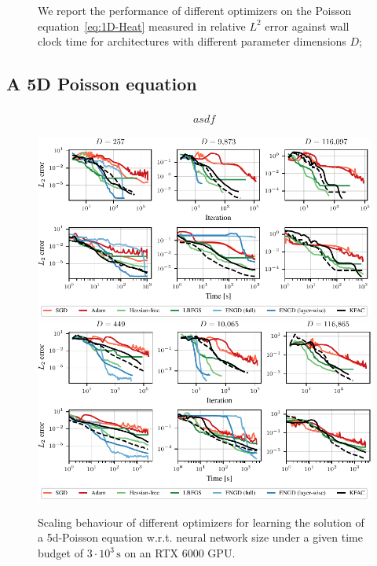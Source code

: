 \begin{figure}
    \centering
    \caption{We report the performance of different optimizers on the Poisson equation~\eqref{eq:1D-Heat} measured in relative $L^2$ error against wall clock time for architectures with different parameter dimensions $D$; }
    \label{fig:1D-heat}
\end{figure}


\subsection{A 5D Poisson equation}

\begin{align}
    \begin{split}
        asdf
    \end{split}
\end{align}

\begin{figure}[tb]
  \centering
  \includegraphics{../kfac_pinns_exp/exp17_groupplot_poisson2d/l2_error.pdf}
  \includegraphics{../kfac_pinns_exp/exp18_groupplot_poisson5d/l2_error.pdf}
  \caption{Scaling behaviour of different optimizers for learning the solution of a 5d-Poisson equation w.r.t.
    neural network size under a given time budget of $3\cdot 10^3\,\text{s}$ on an RTX 6000 GPU.}
  \label{fig:pedagogical-example}
\end{figure}

